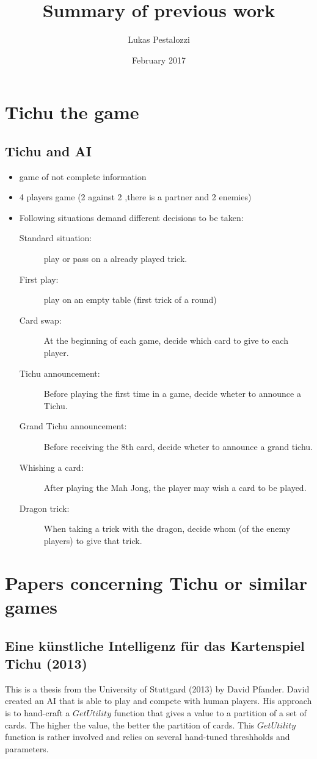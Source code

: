 \documentclass{article}
\title{Summary of previous work}
\author{Lukas Pestalozzi}
\date{February 2017}
\begin{document}
\maketitle

\section{Tichu the game}

\subsection{Tichu and AI}
\begin{itemize}
    \item game of not complete information
    \item 4 players game (2 against 2 ,there is a partner and 2 enemies)
    \item Following situations demand different decisions to be taken:
    \begin{description}
        \item[Standard situation:] play or pass on a already played trick.
        \item[First play:] play on an empty table (first trick of a round)
        \item[Card swap:] At the beginning of each game, decide which card to give to each player.
        \item[Tichu announcement:] Before playing the first time in a game, decide wheter to announce a Tichu.
        \item[Grand Tichu announcement:] Before receiving the 8th card, decide wheter to announce a grand tichu.
        \item[Whishing a card:] After playing the Mah Jong, the player may wish a card to be played.
        \item[Dragon trick:] When taking a trick with the dragon, decide whom (of the enemy players) to give that trick.
    \end{description}
\end{itemize}




\section{Papers concerning Tichu or similar games}

\subsection{Eine künstliche Intelligenz für das Kartenspiel Tichu (2013)}
This is a thesis from the University of Stuttgard (2013) by David Pfander.
David created an AI that is able to play and compete with human players.
His approach is to hand-craft a $GetUtility$ function that gives a value to a partition of a set of cards. The higher the value, the better the partition of cards. This $GetUtility$ function is rather involved and relies on several hand-tuned threshholds and parameters.
\end{document}
